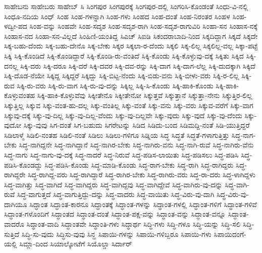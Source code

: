 {ಸಾಹೇಬನು
ಸಾಹೇಬರು
ಸಾಹೇಬ್
ಸಿ
ಸಿಂಗಪುರ
ಸಿಂಗಪುರಕ್ಕೆ
ಸಿಂಗಪುರ-ದಲ್ಲಿ
ಸಿಂಗರಿಸಿ-ಕೊಂಡಂತೆ
ಸಿಂಧು-ವಿ-ನಲ್ಲಿ
ಸಿಂಧೂ-ನದಿಯ
ಸಿಂಧ್
ಸಿಂಹ
ಸಿಂಹ-ಗಳನ್ನಾಗಿ
ಸಿಂಹ-ಗಳು
ಸಿಂಹದ
ಸಿಂಹ-ದಂತೆ
ಸಿಂಹ-ನಿರಂತರ
ಸಿಂಹಳ
ಸಿಂಹ-ಳದ್ವೀ-ಪದ
ಸಿಂಹ-ವನ್ನು
ಸಿಂಹವೇ
ಸಿಂಹ-ಸದೃಶ
ಸಿಂಹ-ಸದೃಶ-ರಾಗಿ
ಸಿಂಹ-ಸದೃಶ-ರಾಗುವಿರಿ
ಸಿಂಹಾ-ಸನ
ಸಿಂಹಾಸ-ನಕ್ಕೆ
ಸಿಂಹಾಸ-ನದ
ಸಿಂಹಾ-ಸನ-ವಿಲ್ಲದೆ
ಸಿಂಹಿಣಿ-ಯಂತಿದ್ದ
ಸಿಎಚ್
ಸಿಐಡಿ
ಸಿಕಂದರಾಬಾದಿ-ನಿಂದ
ಸಿಕ್ಕದಿದ್ದಾಗ
ಸಿಕ್ಕದೆ
ಸಿಕ್ಕದೇ
ಸಿಕ್ಕ-ಬಹು-ದೆಂದು
ಸಿಕ್ಕ-ಬಹು-ದೇನೊ
ಸಿಕ್ಕ-ಬೇಕು
ಸಿಕ್ಕರ
ಸಿಕ್ಕಲಾ-ರ-ದೆಂದು
ಸಿಕ್ಕಲಿ
ಸಿಕ್ಕ-ಲಿಲ್ಲ
ಸಿಕ್ಕಲಿಲ್ಲ-ವಲ್ಲ
ಸಿಕ್ಕಾ-ಪಟ್ಟೆ
ಸಿಕ್ಕಿ
ಸಿಕ್ಕಿ-ಕೊಂಡಿದೆ
ಸಿಕ್ಕಿ-ಕೊಂಡಿದ್ದಾರೆ
ಸಿಕ್ಕಿ-ಕೊಂಡಿ-ರು-ವಂತಿದೆ
ಸಿಕ್ಕಿ-ಕೊಂಡು
ಸಿಕ್ಕಿ-ಕೊಳ್ಳುವು-ದಕ್ಕೆ
ಸಿಕ್ಕಿತು
ಸಿಕ್ಕಿದ
ಸಿಕ್ಕಿ-ದನಲ್ಲ
ಸಿಕ್ಕಿ-ದರು
ಸಿಕ್ಕಿ-ದರೂ
ಸಿಕ್ಕಿ-ದರೆ
ಸಿಕ್ಕಿ-ದವರ
ಸಿಕ್ಕಿ-ದವ-ರನ್ನು
ಸಿಕ್ಕಿ-ದಾಗ
ಸಿಕ್ಕಿ-ದಾಗ-ಲೆಲ್ಲ
ಸಿಕ್ಕಿ-ದುದಕ್ಕಾಗಿ
ಸಿಕ್ಕಿದೆ
ಸಿಕ್ಕಿ-ದೊಡ-ನೆಯೇ
ಸಿಕ್ಕಿದ್ದ
ಸಿಕ್ಕಿದ್ದರೆ
ಸಿಕ್ಕಿದ್ದು
ಸಿಕ್ಕಿ-ಬಿಟ್ಟ-ನೆಂದು
ಸಿಕ್ಕಿ-ಬಿಡು-ವನು
ಸಿಕ್ಕಿ-ಬೀಳು-ವರು
ಸಿಕ್ಕಿ-ರ-ಲಿಲ್ಲ
ಸಿಕ್ಕಿ-ರುವ
ಸಿಕ್ಕಿ-ರು-ವರು
ಸಿಕ್ಕಿ-ರು-ವಾಗ
ಸಿಕ್ಕಿ-ರು-ವು-ದನ್ನು
ಸಿಕ್ಕಿಲ್ಲ
ಸಿಕ್ಕಿ-ಸಿ-ಕೊಂಡು
ಸಿಕ್ಕಿ-ಹಾಕಿ-ಕೊಂಡು
ಸಿಕ್ಕಿ-ಹಾಕಿ-ಕೊಳ್ಳುವಂತಹ
ಸಿಕ್ಕಿ-ಹಾಕಿ-ಕೊಳ್ಳುವೆವು
ಸಿಕ್ಕೀತೇನೊ
ಸಿಕ್ಕೀತೇನೋ
ಸಿಕ್ಕುತ್ತವೆ
ಸಿಕ್ಕುತ್ತಾನೆ
ಸಿಕ್ಕುತ್ತಾ-ನೇನು
ಸಿಕ್ಕುತ್ತಿರ-ಲಿಲ್ಲ
ಸಿಕ್ಕುತ್ತಿಲ್ಲ
ಸಿಕ್ಕುವ
ಸಿಕ್ಕು-ವಂತ-ಹು-ದಲ್ಲ
ಸಿಕ್ಕು-ವಂತಿಲ್ಲ
ಸಿಕ್ಕು-ವಂತೆ
ಸಿಕ್ಕು-ವನು
ಸಿಕ್ಕು-ವರು
ಸಿಕ್ಕುವ-ವರೆಗೆ
ಸಿಕ್ಕು-ವಾಗ
ಸಿಕ್ಕುವು-ದಕ್ಕೆ
ಸಿಕ್ಕು-ವು-ದಿಲ್ಲ
ಸಿಕ್ಕು-ವು-ದಿಲ್ಲ-ವೆಂದು
ಸಿಕ್ಕು-ವು-ದಿಲ್ಲವೇ
ಸಿಕ್ಕು-ವುದು
ಸಿಕ್ಕು-ವುದೆ
ಸಿಕ್ಕು-ವು-ದೆಂದು
ಸಿಕ್ಕು-ವುದೋ
ಸಿಕ್ಕು-ವುವು
ಸಿಗ-ದಂತೆ
ಸಿಗ-ಬಹುದು
ಸಿಗರೇಟನ್ನು
ಸಿಡಿದ
ಸಿಡಿದು-ಬಂದ
ಸಿಡಿಮದ್ದಿ-ನಂತೆ
ಸಿಡಿ-ಯುತ್ತಿದ್ದರೆ
ಸಿಡಿಲಾಳ್ಮೆ
ಸಿಡಿಲಿ-ನಂತಹ
ಸಿಡಿಲಿ-ನಂತೆ
ಸಿಡಿಲು
ಸಿಡಿಲು-ಗಳಿಗೂ
ಸಿಡ್ನಿಯ
ಸಿದ್ಧ
ಸಿದ್ಧತೆ
ಸಿದ್ಧತೆ-ಗಳಾಗುತ್ತಿತ್ತು
ಸಿದ್ಧ-ನಾಗ-ಬೇಕು
ಸಿದ್ಧ-ನಾಗಿದ್ದನೇ
ಸಿದ್ಧ-ನಾಗಿದ್ದಾನೆ
ಸಿದ್ಧ-ನಾಗಿರ-ಬೇಕು
ಸಿದ್ಧ-ನಾಗಿರು-ವನು
ಸಿದ್ಧ-ನಾಗಿ-ರುವೆ
ಸಿದ್ಧ-ನಾಗಿರು-ವೆನು
ಸಿದ್ಧ-ನಾಗು
ಸಿದ್ಧ-ನಾಗು-ವು-ದಕ್ಕೆ
ಸಿದ್ಧ-ನಾದರೆ
ಸಿದ್ಧ-ನಿರುವೆ
ಸಿದ್ಧ-ಪಡಿಸ-ಲಾಯಿತು
ಸಿದ್ಧ-ಪಡಿಸಲು
ಸಿದ್ಧ-ಪಡಿಸಿ
ಸಿದ್ಧ-ಪಡಿಸಿ-ಕೊಂಡದ್ದು
ಸಿದ್ಧ-ಪಡಿಸಿ-ಕೊಂಡು
ಸಿದ್ಧ-ಮಾಡಿ-ಕೊಂಡು
ಸಿದ್ಧ-ರಾಗ-ಬೇಕು
ಸಿದ್ಧ-ರಾಗಿ
ಸಿದ್ಧ-ರಾಗಿದ್ದರು
ಸಿದ್ಧ-ರಾಗಿದ್ದರೇ
ಸಿದ್ಧ-ರಾಗಿದ್ದ-ವರು
ಸಿದ್ಧ-ರಾಗಿದ್ದಾರೆ
ಸಿದ್ಧ-ರಾಗಿರ-ಬೇಕು
ಸಿದ್ಧ-ರಾಗಿರು-ವರು
ಸಿದ್ಧ-ರಾ-ದರು
ಸಿದ್ಧ-ಳಾಗಿದ್ದಳು
ಸಿದ್ಧ-ವಾಗಿತ್ತು
ಸಿದ್ಧ-ವಾಗಿದೆ
ಸಿದ್ಧ-ವಾಗಿದ್ದರು
ಸಿದ್ಧ-ವಾಗಿದ್ದವು
ಸಿದ್ಧ-ವಾಗಿದ್ದೇವೆ
ಸಿದ್ಧ-ವಾಗಿರು-ವು-ದನ್ನು
ಸಿದ್ಧ-ವಾಗಿ-ರುವೆ
ಸಿದ್ಧ-ವಾಗುತ್ತದೆ
ಸಿದ್ಧ-ವಾಗುತ್ತಿದ್ದು-ದನ್ನು
ಸಿದ್ಧ-ವಾದರು
ಸಿದ್ಧ-ವಾಯಿತು
ಸಿದ್ಧ-ವಿರು-ವು-ದಾಗಿ
ಸಿದ್ಧ-ವಿರು-ವು-ದಾಗಿಯೂ
ಸಿದ್ಧಾಂತ
ಸಿದ್ಧಾಂತ-ಕಾರನೂ
ಸಿದ್ಧಾಂತಕ್ಕೆ
ಸಿದ್ಧಾಂತ-ಗಳನ್ನು
ಸಿದ್ಧಾಂತ-ಗಳಲ್ಲಿ
ಸಿದ್ಧಾಂತ-ಗಳಿಗೆ
ಸಿದ್ಧಾಂತ-ಗಳಿವೆ
ಸಿದ್ಧಾಂತ-ಗಳೊಂದಿಗೆ
ಸಿದ್ಧಾಂತದ
ಸಿದ್ಧಾಂತ-ದಂತೆ
ಸಿದ್ಧಾಂತ-ಪಕ್ಷ-ವನ್ನು
ಸಿದ್ಧಾಂತ-ವನ್ನು
ಸಿದ್ಧಾಂತ-ವನ್ನೂ
ಸಿದ್ಧಾಂತ-ವಾದರೊ
ಸಿದ್ಧಾಂತ-ವಾದಿ
ಸಿದ್ಧಾಂತವೇ
ಸಿದ್ಧಾಂತಿ-ಗಳು
ಸಿದ್ಧಾರ್ಥ
ಸಿದ್ಧಿ-ಗಳು
ಸಿದ್ಧಿ-ಗಳೂ
ಸಿದ್ಧಿ-ಯನ್ನು
ಸಿದ್ಧಿ-ಸಲಿ
ಸಿದ್ಧಿ-ಸುತ್ತಿದೆ
ಸಿದ್ಧಿ-ಸು-ವುದು
ಸಿದ್ಧಿಸು-ವುವು
ಸಿನ್ಹ
ಸಿಪಾಯಿ-ಗಳನ್ನು
ಸಿಪಾಯಿ-ಗಳಿಬ್ಬರೂ
ಸಿಪಾಯಿ-ಗಳು
ಸಿಪಾಯಿದಂಗೆ-ಯಲ್ಲಿ
ಸಿಮ್ಲಾ-ದಿಂದ
ಸಿಯಾಲ್ಕೋಟೆಗೆ
ಸಿಯೊಲ್ಡಾ
ಸಿರ್ದಾರ್
}

